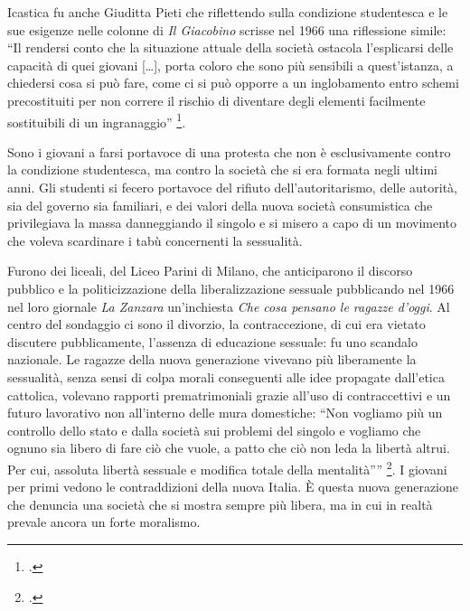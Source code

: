 Icastica fu anche Giuditta Pieti che riflettendo sulla condizione studentesca e le sue esigenze nelle colonne di \textit{Il Giacobino} scrisse nel 1966 una riflessione simile: \enquote{Il rendersi conto che la situazione attuale della società ostacola l’esplicarsi delle capacità di quei giovani […], porta coloro che sono più sensibili a quest'istanza, a chiedersi cosa si può fare, come ci si può opporre a un inglobamento entro schemi precostituiti per non correre il rischio di diventare degli elementi facilmente sostituibili di un ingranaggio} \footcite{Pieti}.

Sono i giovani a farsi portavoce di una protesta che non è esclusivamente contro la condizione studentesca, ma contro la società che si era formata negli ultimi anni.
Gli studenti si fecero portavoce del rifiuto dell'autoritarismo, delle autorità, sia del governo sia familiari, e dei valori della nuova società consumistica che privilegiava la massa danneggiando il singolo e si misero a capo di un movimento che voleva scardinare i tabù concernenti la sessualità.

Furono dei liceali, del Liceo Parini di Milano, che anticiparono il discorso pubblico e la politicizzazione della liberalizzazione sessuale pubblicando nel 1966 nel loro giornale \textit{La Zanzara} un'inchiesta \textit{Che cosa pensano le ragazze d’oggi}.
Al centro del sondaggio ci sono il divorzio, la contraccezione, di cui era vietato discutere pubblicamente, l'assenza di educazione sessuale: fu uno scandalo nazionale. 
Le ragazze della nuova generazione vivevano più liberamente la sessualità, senza sensi di colpa morali conseguenti alle idee propagate dall'etica cattolica, volevano rapporti prematrimoniali grazie all'uso di contraccettivi e un futuro lavorativo non all'interno delle mura domestiche: \enquote{Non vogliamo più un controllo dello stato e dalla società sui problemi del singolo e vogliamo che ognuno sia libero di fare ciò che vuole, a patto che ciò non leda la libertà altrui. Per cui, assoluta libertà sessuale e modifica totale della mentalità”} \footcite{Zanzara}.
I giovani per primi vedono le contraddizioni della nuova Italia.
È questa nuova generazione che denuncia una società che si mostra sempre più libera, ma in cui in realtà prevale ancora un forte moralismo.

